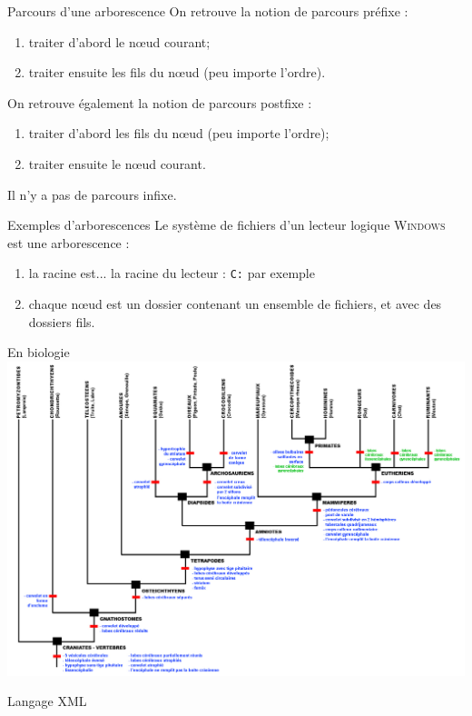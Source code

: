 \documentclass[10pt]{beamer}
\begin{document}
\begin{frame}{Parcours d'une arborescence}
On retrouve la notion de parcours préfixe : 
\begin{enumerate}[--]
	\item 	traiter d'abord le n\oe ud courant;
	\item 	traiter ensuite les fils du n\oe ud (peu importe l'ordre).
\end{enumerate}
On retrouve également la notion de parcours postfixe :
\begin{enumerate}[--]
	\item 	traiter d'abord les fils du n\oe ud (peu importe l'ordre);
	\item 	traiter ensuite le n\oe ud courant.
\end{enumerate}
Il n'y a pas de parcours infixe.
\end{frame}
\begin{frame}{Exemples d'arborescences}
Le système de fichiers d'un lecteur logique \textsc{Windows} est une arborescence :
\begin{enumerate}[--]
	\item 	la racine est... la racine du lecteur : \texttt{C:} par exemple
	\item 	chaque n\oe ud est un dossier contenant un ensemble de fichiers, et avec des dossiers fils.	
\end{enumerate}
\end{frame}
\begin{frame}{En biologie}
\includegraphics[width=\linewidth]{img/philo}
\end{frame}
\begin{frame}[fragile]{Langage XML}
\inputminted[fontsize=\small]{xml}{scripts/recette.xml}
\end{frame}
\end{document}
